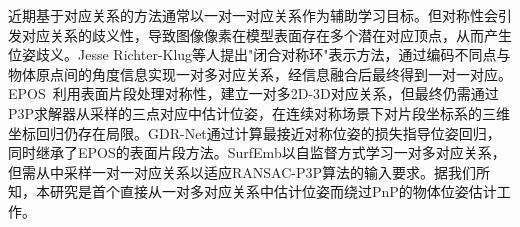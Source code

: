 \par 近期基于对应关系的方法通常以一对一对应关系作为辅助学习目标。但对称性会引发对应关系的歧义性，导致图像像素在模型表面存在多个潜在对应顶点，从而产生位姿歧义。Jesse Richter-Klug等人\cite{richter2021handling}提出"闭合对称环"表示方法，通过编码不同点与物体原点间的角度信息实现一对多对应关系，经信息融合后最终得到一对一对应。EPOS~\cite{hodan2020epos}利用表面片段处理对称性，建立一对多2D-3D对应关系，但最终仍需通过P3P求解器从采样的三点对应中估计位姿，在连续对称场景下对片段坐标系的三维坐标回归仍存在局限。GDR-Net\cite{wang2021gdr}通过计算最接近对称位姿的损失指导位姿回归，同时继承了EPOS\cite{hodan2020epos}的表面片段方法。SurfEmb\cite{haugaard2022surfemb}以自监督方式学习一对多对应关系，但需从中采样一对一对应关系以适应RANSAC-P3P算法的输入要求。据我们所知，本研究是首个直接从一对多对应关系中估计位姿而绕过PnP的物体位姿估计工作。